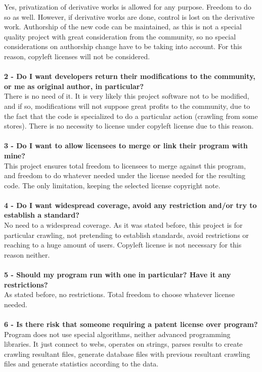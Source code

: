 \documentclass[11pt]{article}
\begin{document}
Yes, privatization of derivative works is allowed for any purpose. Freedom to do so as well. However, if derivative works are done, control is lost on the derivative work. Authorship of the new code can be maintained, as this is not a special quality project with great consideration from the community, so no special considerations on authorship change have to be taking into account. For this reason, copyleft licenses will not be considered.\\
\\
\textbf{2 - Do I want developers return their modifications to the community, or me as original author, in particular?}\\
There is no need of it. It is very likely this project software not to be modified, and if so, modifications will not suppose great profits to the community, due to the fact that the code is specialized to do a particular action (crawling from some stores). There is no necessity to license under copyleft license due to this reason.\\
\\
\textbf{3 - Do I want to allow licensees to merge or link their program with mine?}\\
This project ensures total freedom to licensees to merge against this program, and freedom to do whatever needed under the license needed for the resulting code. The only limitation, keeping the selected license copyright note.\\
\\
\textbf{4 - Do I want widespread coverage, avoid any restriction and/or try to establish a standard?}\\
No need to a widespread coverage. As it was stated before, this project is for particular crawling, not pretending to establish standards, avoid restrictions or reaching to a huge amount of users. Copyleft license is not necessary for this reason neither.\\
\\
\textbf{5 - Should my program run with one in particular? Have it any restrictions?}\\
As stated before, no restrictions. Total freedom to choose whatever license needed.\\
\\
\textbf{6 - Is there risk that someone requiring a patent license over program?}\\
Program does not use special algorithms, neither advanced programming libraries. It just connect to webs, operates on strings, parses results to create crawling resultant files, generate database files with previous resultant crawling files and generate statistics according to the data.\\
\end{document}

